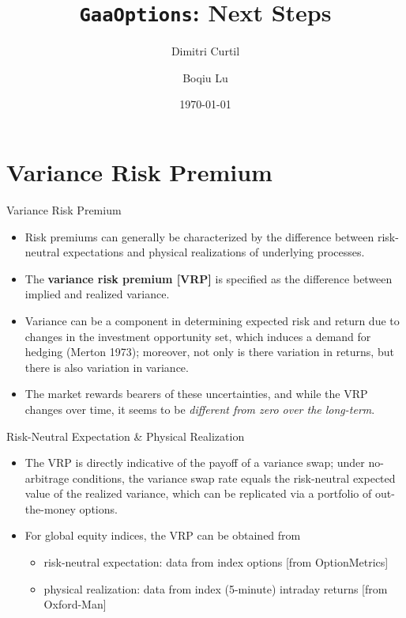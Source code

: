 \documentclass{beamer}
\title[{\tt GaaOptions}]{{\tt GaaOptions}: Next Steps}
\author[DC $|$ BL]{Dimitri Curtil \and Boqiu Lu}
\date{\today}
\begin{document}
\begin{frame}
  \titlepage
\end{frame}

\section{Variance Risk Premium}
\begin{frame}{Variance Risk Premium}

\begin{itemize}
\item Risk premiums can generally be characterized by the difference between risk-neutral expectations and physical realizations of underlying processes. 
\vfill
\item The {\bf variance risk premium [VRP]} is specified as the difference between implied and realized variance.
\vfill
\item Variance can be a component in determining expected risk and return due to changes in the investment opportunity set, which induces a demand for hedging (Merton 1973); moreover, not only is there variation in returns, but there is also variation in variance. 
\vfill
\item The market rewards bearers of these uncertainties, and while the VRP changes over time, it seems to be {\em different from zero over the long-term}.
\vfill
\end{itemize}
\end{frame}

\begin{frame}{Risk-Neutral Expectation \& Physical Realization}
\begin{itemize}
\item The VRP is directly indicative of the payoff of a variance swap; under no-arbitrage conditions, the variance swap rate equals the risk-neutral expected value of the realized variance, which can be replicated via a portfolio of out-the-money options.
\vfill
\item For global equity indices, the VRP can be obtained from
\begin{itemize}
\item risk-neutral expectation: data from index options [from OptionMetrics]
\item physical realization: data from index (5-minute) intraday returns [from Oxford-Man]
\end{itemize}
\vfill
\end{itemize}
\end{frame}
\end{document}
